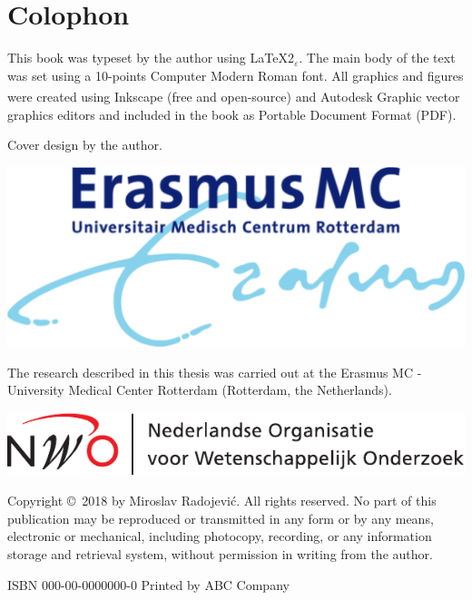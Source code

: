 
\newpage
\setlength{\parindent}{0pt}
\thispagestyle{empty}

\section*{Colophon}

\bigskip
This book was typeset by the author using \LaTeX{}2{\LARGE $_{\varepsilon}$}. The main body of the text was set using a 10-points Computer Modern Roman font. All graphics and figures were created using Inkscape (free and open-source) and Autodesk \textsuperscript{\textregistered}Graphic vector graphics editors and included in the book as Portable Document Format (PDF). %

\bigskip
Cover design by the author.%
\bigskip

\vfill
\includegraphics[height=0.08\textheight]{./logos/emc}

The research described in this thesis was carried out at the Erasmus MC - University Medical Center Rotterdam (Rotterdam, the Netherlands). 
\bigskip

\includegraphics[height=0.07\textheight]{./logos/nwo-nl}

\bigskip

Copyright \copyright\ 2018 by Miroslav Radojevi\'{c}. All rights reserved. No part of this publication may be reproduced or transmitted in any form or by any means, electronic or mechanical, including photocopy, recording, or any information storage and retrieval system, without permission in writing from the author.

\bigskip
ISBN 000-00-0000000-0
\bigskip
Printed by ABC Company
\setlength{\parindent}{\myindent}

